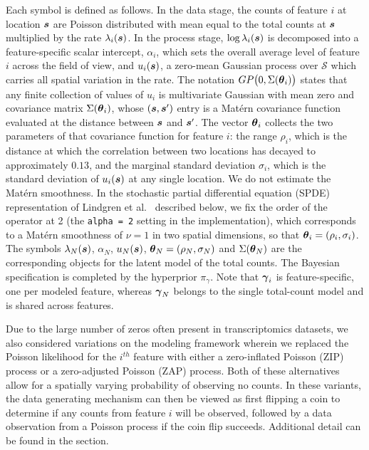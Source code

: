 \documentclass[10pt,letterpaper]{article}
\begin{document}
Each symbol is defined as follows. In the data stage, the counts of feature $i$ at location $\mbox{\boldmath $s$}$ are Poisson distributed with mean equal to the total counts at $\mbox{\boldmath $s$}$ multiplied by the rate $\lambda_i(\mbox{\boldmath $s$})$. In the process stage, $\log\lambda_i(\mbox{\boldmath $s$})$ is decomposed into a feature-specific scalar intercept, $\alpha_i$, which sets the overall average level of feature $i$ across the field of view, and $u_i(\mbox{\boldmath $s$})$, a zero-mean Gaussian process over $\mathcal{S}$ which carries all spatial variation in the rate. The notation $GP\big(0,\Sigma(\mbox{\boldmath $\theta$}_i)\big)$ states that any finite collection of values of $u_i$ is multivariate Gaussian with mean zero and covariance matrix $\Sigma(\mbox{\boldmath $\theta$}_i)$, whose $(\mbox{\boldmath $s$},\mbox{\boldmath $s$}')$ entry is a Mat\'ern covariance function evaluated at the distance between $\mbox{\boldmath $s$}$ and $\mbox{\boldmath $s$}'$. The vector $\mbox{\boldmath $\theta$}_i$ collects the two parameters of that covariance function for feature $i$: the range $\rho_i$, which is the distance at which the correlation between two locations has decayed to approximately $0.13$, and the marginal standard deviation $\sigma_i$, which is the standard deviation of $u_i(\mbox{\boldmath $s$})$ at any single location. We do not estimate the Mat\'ern smoothness. In the stochastic partial differential equation (SPDE) representation of Lindgren et al.\ \cite{lindgren2011} described below, we fix the order of the operator at 2 (the \texttt{alpha = 2} setting in the implementation), which corresponds to a Mat\'ern smoothness of $\nu=1$ in two spatial dimensions, so that $\mbox{\boldmath $\theta$}_i = (\rho_i, \sigma_i)$. The symbols $\lambda_N(\mbox{\boldmath $s$})$, $\alpha_N$, $u_N(\mbox{\boldmath $s$})$, $\mbox{\boldmath $\theta$}_N = (\rho_N,\sigma_N)$ and $\Sigma(\mbox{\boldmath $\theta$}_N)$ are the corresponding objects for the latent model of the total counts. The Bayesian specification is completed by the hyperprior $\pi_\gamma$. Note that $\mbox{\boldmath $\gamma$}_i$ is feature-specific, one per modeled feature, whereas $\mbox{\boldmath $\gamma$}_N$ belongs to the single total-count model and is shared across features.

Due to the large number of zeros often present in transcriptomics datasets, we also considered variations on the modeling framework wherein we replaced the Poisson likelihood for the $i^{th}$ feature with either a zero-inflated Poisson (ZIP) process or a zero-adjusted Poisson (ZAP) process. Both of these alternatives allow for a spatially varying probability of observing no counts. In these variants, the data generating mechanism can then be viewed as first flipping a coin to determine if any counts from feature $i$ will be observed, followed by a data observation from a Poisson process if the coin flip succeeds. Additional detail can be found in the  section.
\end{document}
